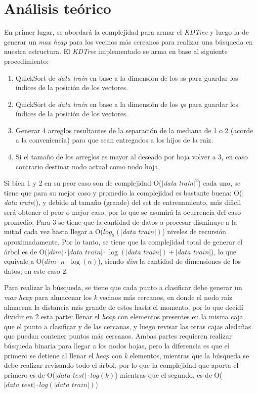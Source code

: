 \documentclass[12pt]{article}
\begin{document}
\section*{Análisis teórico}
\hspace{5mm}
En primer lugar, se abordará la complejidad para armar el \textit{KDTree} y luego la de generar un 
\textit{max heap} para los vecinos más cercanos para realizar una búsqueda en nuestra estructura. 
El \textit{KDTree} implementado se arma en base al siguiente procedimiento:
\begin{enumerate}
    \item QuickSort de \textit{data train} en base a la dimensión de los \textit{x}s para guardar los 
    índices de la posición de los vectores.
    \item QuickSort de \textit{data train} en base a la dimensión de los \textit{y}s para guardar los 
    índices de la posición de los vectores.
    \item Generar 4 arreglos resultantes de la separación de la mediana de 1 o 2 (acorde a la conveniencia) 
    para que sean entregados a los hijos de la raiz.
    \item Si el tamaño de los arreglos es mayor al deseado por hoja volver a 3, en caso contrario destinar 
    nodo actual como nodo hoja.
\end{enumerate}
\hspace{5mm}
Si bien 1 y 2 en su peor caso son de complejidad O($|$\textit{data train}$|^2$) cada uno, se tiene que para 
su mejor caso y promedio la complejidad es bastante buena: O($|$\textit{data train}$|$), y debido al tamaño 
(grande) del set de entrenamiento, más dificil será obtener el peor o mejor caso, por lo que se asumirá la 
ocurrencia del caso promedio. Para 3 se tiene que la cantidad de datos a procesar disminuye a la mitad cada 
vez hasta llegar a O($log_2(|\textit{data train}|)$) niveles de recursión aproximadamente. Por lo tanto, se 
tiene que la complejidad total de generar el árbol es de O($|dim|\cdot|\textit{data train}|\cdot
\log(|\textit{data train}|) + |\textit{data train}|$), lo que equivale a O($dim\cdot n\cdot\log(n)$), siendo 
\textit{dim} la cantidad de dimensiones de los datos, en este caso 2.

\newpage
\hspace{5mm}
Para realizar la búsqueda, se tiene que cada punto a clasificar debe generar un \textit{max heap} para 
almacenar los \textit{k} vecinos más cercanos, en donde el nodo raíz almacena la distancia más grande de estos 
hasta el momento, por lo que decidí dividir en 2 esta parte: llenar el \textit{heap} con elementos presentes en 
la misma caja que el punto a clasificar y de las cercanas, y luego revisar las otras cajas aledañas que puedan 
contener puntos más cercanos. Ambas partes requieren realizar búsqueda binaria para llegar a los nodos hojas, 
pero la diferencia es que el primero se detiene al llenar el \textit{heap} con \textit{k} elementos, mientras 
que la búsqueda se debe realizar revisando todo el árbol, por lo que la complejidad que aporta el primero es de 
O($|\textit{data test}|\cdot log(k)$) mientras que el segundo, es de O($|\textit{data test}|\cdot 
log(|\textit{data train}|)$)
\end{document}
